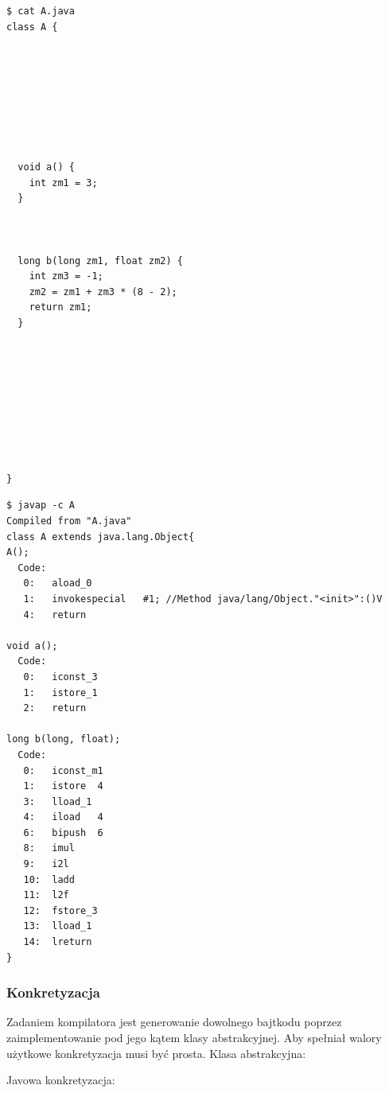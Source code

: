 \documentclass[a4paper,12pt]{article}
\begin{document}
\newpage
\begin{table}[h!]
\centering

\begin{minipage}{8cm}
\centering
\begin{verbatim}
$ cat A.java
class A {








  void a() {
    int zm1 = 3;
  }
  
  
  
  long b(long zm1, float zm2) {
    int zm3 = -1;
    zm2 = zm1 + zm3 * (8 - 2);
    return zm1;
  }









}
\end{verbatim}
\end{minipage}
\begin{minipage}{8cm}
\centering
\begin{verbatim}
$ javap -c A
Compiled from "A.java"
class A extends java.lang.Object{
A();
  Code:
   0:	aload_0
   1:	invokespecial	#1; //Method java/lang/Object."<init>":()V
   4:	return

void a();
  Code:
   0:	iconst_3
   1:	istore_1
   2:	return

long b(long, float);
  Code:
   0:	iconst_m1
   1:	istore	4
   3:	lload_1
   4:	iload	4
   6:	bipush	6
   8:	imul
   9:	i2l
   10:	ladd
   11:	l2f
   12:	fstore_3
   13:	lload_1
   14:	lreturn
}
\end{verbatim}
\end{minipage}

\caption{Porównanie Javy i jej bajtkodu}
\end{table}



\subsubsection{Konkretyzacja}
Zadaniem kompilatora jest generowanie dowolnego bajtkodu poprzez zaimplementowanie pod jego kątem klasy abstrakcyjnej. Aby spełniał walory użytkowe konkretyzacja musi być prosta. Klasa abstrakcyjna:

\newpage
Javowa konkretyzacja:

\end{document}
